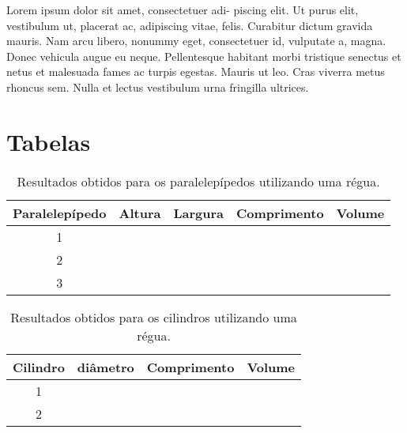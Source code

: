 \begin{question}[type={exam}]{2}
Lorem ipsum dolor sit amet, consectetuer adi-
piscing elit. Ut purus elit, vestibulum ut, placerat ac, adipiscing vitae,
felis. Curabitur dictum gravida mauris. Nam arcu libero, nonummy
eget, consectetuer id, vulputate a, magna. Donec vehicula augue
eu neque. Pellentesque habitant morbi tristique senectus et netus
et malesuada fames ac turpis egestas. Mauris ut leo. Cras viverra
metus rhoncus sem. Nulla et lectus vestibulum urna fringilla ultrices.
\end{question}



\vfill
\pagebreak
\section{Tabelas}

\begin{table*}[!htpb]
	\caption{Resultados obtidos para os paralelepípedos utilizando uma régua.}
	\label{TabelaDadosRegua}
	\begin{tabular}{ccccc}
		\toprule
		{\centering Paralelepípedo} & Altura & Largura & Comprimento & Volume  \\
		\midrule
		\rowcolor[gray]{0.9} 1 & \phantom{xxxxxxxxxxxxxxx} & \phantom{xxxxxxxxxxxxxxx} & \phantom{xxxxxxxxxxxxxxx} & \phantom{xxxxxxxxxxxxxxx} \\
		2 &  &  & & \\
		\rowcolor[gray]{0.9} 3 &  &  & & \\
		\bottomrule
	\end{tabular}
\end{table*}

\begin{table*}[!htpb]
	\caption{Resultados obtidos para os cilindros utilizando uma régua.}
	\label{TabelaDadosReguaCil}
	\begin{tabular}{cccc}
		\toprule
		{\centering Cilindro} & diâmetro & Comprimento & Volume  \\
		\midrule
		\rowcolor[gray]{0.9} 1 & \phantom{xxxxxxxxxxxxxxx} & \phantom{xxxxxxxxxxxxxxx} & \phantom{xxxxxxxxxxxxxxx} \\
		2 &  &  & \\
		\bottomrule
	\end{tabular}
\end{table*}

